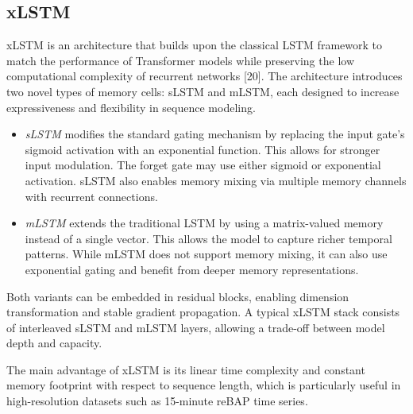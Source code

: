 \documentclass[class=scrbook, crop=false]{standalone}
\begin{document}


\subsection{xLSTM}
\label{Section::xLSTM}
\gls{xLSTM} is an architecture that builds upon the classical LSTM framework to match the performance of Transformer models while preserving the low computational complexity of recurrent networks [20]. The architecture introduces two novel types of memory cells: sLSTM and mLSTM, each designed to increase expressiveness and flexibility in sequence modeling.
\begin{itemize}
\item \textit{sLSTM} modifies the standard gating mechanism by replacing the input gate's sigmoid activation with an exponential function. This allows for stronger input modulation. The forget gate may use either sigmoid or exponential activation. sLSTM also enables memory mixing via multiple memory channels with recurrent connections.
\item \textit{mLSTM} extends the traditional LSTM by using a matrix-valued memory instead of a single vector. This allows the model to capture richer temporal patterns. While mLSTM does not support memory mixing, it can also use exponential gating and benefit from deeper memory representations.
\end{itemize}

Both variants can be embedded in residual blocks, enabling dimension transformation and stable gradient propagation. A typical xLSTM stack consists of interleaved sLSTM and mLSTM layers, allowing a trade-off between model depth and capacity.

The main advantage of xLSTM is its linear time complexity and constant memory footprint with respect to sequence length, which is particularly useful in high-resolution datasets such as 15-minute reBAP time series.


\end{document}
